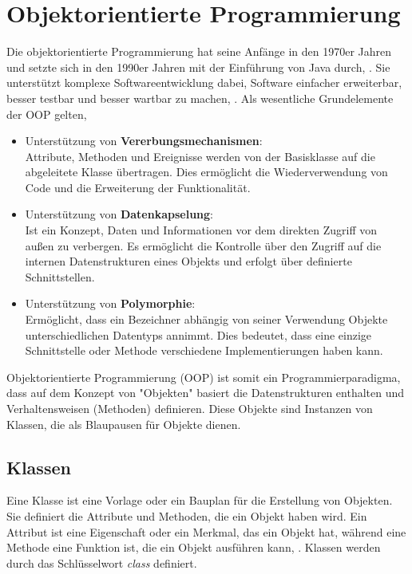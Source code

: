 \chapter{Objektorientierte Programmierung}\label{Objektorientierte Programmierung}

Die objektorientierte Programmierung hat seine Anfänge in den 1970er Jahren und setzte sich in den 1990er Jahren mit der Einführung von Java durch, \cite{Steyer:2018}. Sie unterstützt komplexe Softwareentwicklung dabei, Software einfacher erweiterbar, besser testbar und besser wartbar zu machen, \cite{Lahres:2021}. Als wesentliche Grundelemente der OOP gelten, \cite{Lahres:2021}


\begin{itemize}
	\itemsep0pt
	\item Unterstützung von \textbf{Vererbungsmechanismen}: \\
	Attribute, Methoden und Ereignisse werden von der Basisklasse auf die abgeleitete Klasse übertragen. Dies ermöglicht die Wiederverwendung von Code und die Erweiterung der Funktionalität.
	\item Unterstützung von \textbf{Datenkapselung}: \\
	Ist ein Konzept, Daten und Informationen vor dem direkten Zugriff von außen zu verbergen. Es ermöglicht die Kontrolle über den Zugriff auf die internen Datenstrukturen eines Objekts und erfolgt über definierte Schnittstellen.
	\item Unterstützung von \textbf{Polymorphie}: \\
	Ermöglicht, dass ein Bezeichner abhängig von seiner Verwendung Objekte unterschiedlichen Datentyps annimmt. Dies bedeutet, dass eine einzige Schnittstelle oder Methode verschiedene Implementierungen haben kann.
\end{itemize}

Objektorientierte Programmierung (OOP) ist somit ein Programmierparadigma, dass auf dem Konzept von "Objekten" basiert die Datenstrukturen enthalten und Verhaltensweisen (Methoden) definieren. Diese Objekte sind Instanzen von Klassen, die als Blaupausen für Objekte dienen. 

\section{Klassen}
Eine Klasse ist eine Vorlage oder ein Bauplan für die Erstellung von Objekten. Sie definiert die Attribute und Methoden, die ein Objekt haben wird. Ein Attribut ist eine Eigenschaft oder ein Merkmal, das ein Objekt hat, während eine Methode eine Funktion ist, die ein Objekt ausführen kann, \cite{Steyer:2018}. Klassen werden durch das Schlüsselwort \textit{class} definiert. 

